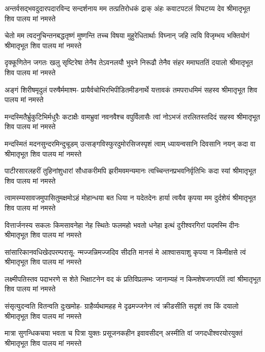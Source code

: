 \fourlineindentedshloka
{अन्तर्वसद्भवदुदारपदारविन्द}
{सन्दर्शनाय मम तत्प्रतिरोधकं द्राक्}
{अंहः कवाटपटलं विघटय्य देव}
{श्रीमातृभूत शिव पालय मां नमस्ते} %

\fourlineindentedshloka
{चेतो मम त्वदनुचिन्तनबद्धतृष्णं}
{मुष्णन्ति तच्च विषया मुहुरेधितार्थाः}
{विघ्नान् जहि त्वयि विजृम्भय भक्तियोगं}
{श्रीमातृभूत शिव पालय मां नमस्ते} %

\fourlineindentedshloka
{दृक्कूणितेन जगतः खलु सृष्टिरेषा}
{तेनैव तेऽवनलयौ भुवने निरूढौ}
{तेनैव संहर ममाघततिं दयालो}
{श्रीमातृभूत शिव पालय मां नमस्ते} %

\fourlineindentedshloka
{अङ्गं शिरीषमृदुलं परुषैर्ममाश्म-}
{प्रायैर्वचोभिरभिपीडितमीडनार्थे}
{यत्तावकं तमपराधमिमं सहस्व}
{श्रीमातृभूत शिव पालय मां नमस्ते} %

\fourlineindentedshloka
{मन्दस्मितैर्भ्रुकुटिभिर्मधुरैः कटाक्षैः}
{वामभ्रुवां नवनवैश्च वपुर्विलासैः}
{त्वां नोऽभजं तरलितस्तदिदं सहस्व}
{श्रीमातृभूत शिव पालय मां नमस्ते} %

\fourlineindentedshloka
{मन्दस्मितं मदनसुन्दरमिन्दुचूडम्}
{उत्सङ्गविस्फुरदुमोरसिजस्पृशं त्वाम्}
{ध्यायन्वसानि दिवसानि नयन् कदा वा}
{श्रीमातृभूत शिव पालय मां नमस्ते} %

\fourlineindentedshloka
{पाटीरसारलहरीं तुहिनांशुधारां}
{सौधाकरीमपि झरीमवमन्यमानः}
{त्वच्चिन्तनप्रभवनिर्वृतिभिः कदा स्यां}
{श्रीमातृभूत शिव पालय मां नमस्ते} %

\fourlineindentedshloka
{त्वामस्म्यसावजमुपासितुमक्षमोऽहं}
{मोहान्धया बत धिया न यदेतदेनः}
{हार्या त्वयैव कृपया मम दुर्दशेयं}
{श्रीमातृभूत शिव पालय मां नमस्ते} %

\fourlineindentedshloka
{वित्तार्जनस्य सकलः किमसावनेहा}
{नेह स्थितेः फलमहो भवतो धनेहा}
{ इत्थं दुरीश्वरगिरां पदमस्मि दीनः}
{श्रीमातृभूत शिव पालय मां नमस्ते} %

\fourlineindentedshloka
{सांसारिकानवधिखेदपरम्परासू-}
{न्मज्जन्निमज्जदिव सीदति मानसं मे}
{आश्वासयाशु कृपया न किमीक्षसे त्वं}
{श्रीमातृभूत शिव पालय मां नमस्ते} %

\fourlineindentedshloka
{लक्ष्मीपतिस्तव पदाभरणे स शेते}
{भिक्षाटनेन वद कं प्रतिविप्रलम्भः}
{जानाम्यहं न किमशेषजगत्पतिं त्वां}
{श्रीमातृभूत शिव पालय मां नमस्ते} %

\fourlineindentedshloka
{संसृत्युदन्वति वितन्वति दुःखमोह-}
{ग्राहैर्व्यथामहह मे दृढमज्जनेन}
{त्वं क्रीडसीति सदृशं तव किं दयालो}
{श्रीमातृभूत शिव पालय मां नमस्ते} %

\fourlineindentedshloka
{मात्रा सुगन्धिकचया भवता च पित्रा}
{युक्तः प्रसूजनकहीन इवावसीदन्}
{अस्मीति वां जगदधीश्वरयोरयुक्तं}
{श्रीमातृभूत शिव पालय मां नमस्ते} %

